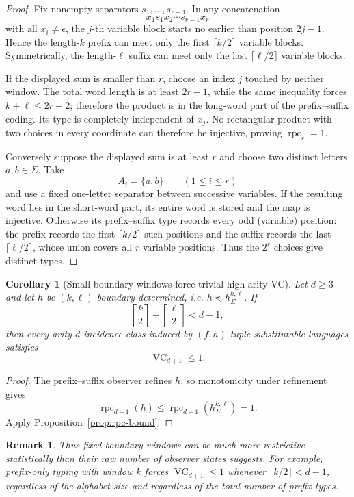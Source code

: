 \documentclass[11pt]{article}
\newtheorem{corollary}[theorem]{Corollary}
\newtheorem{remark}[theorem]{Remark}
\newcommand{\VC}{\operatorname{VC}}
\begin{document}
\begin{proof}
Fix nonempty separators \(s_1,\ldots,s_{r-1}\).  In any concatenation
\[
 x_1s_1x_2\cdots s_{r-1}x_r
\]
with all \(x_i\ne\epsilon\), the \(j\)-th variable block starts no earlier
than position \(2j-1\).  Hence the length-\(k\) prefix can meet only the
first \(\lceil k/2\rceil\) variable blocks.  Symmetrically, the
length-\(\ell\) suffix can meet only the last
\(\lceil\ell/2\rceil\) variable blocks.

If the displayed sum is smaller than \(r\), choose an index \(j\) touched by
neither window.  The total word length is at least \(2r-1\), while the same
inequality forces \(k+\ell\le2r-2\); therefore the product is in the
long-word part of the prefix--suffix coding.  Its type is completely
independent of \(x_j\).  No rectangular product with two choices in every
coordinate can therefore be injective, proving
\(\operatorname{rpc}_r=1\).

Conversely suppose the displayed sum is at least \(r\) and choose two
distinct letters \(a,b\in\Sigma\).  Take
\[
 A_i=\{a,b\}\qquad(1\le i\le r)
\]
and use a fixed one-letter separator between successive variables.  If the
resulting word lies in the short-word part, its entire word is stored and the
map is injective.  Otherwise its prefix--suffix type records every odd
(variable) position: the prefix records the first
\(\lceil k/2\rceil\) such positions and the suffix records the last
\(\lceil\ell/2\rceil\), whose union covers all \(r\) variable positions.
Thus the \(2^r\) choices give distinct types.
\end{proof}

\begin{corollary}[Small boundary windows force trivial high-arity VC]
\label{cor:boundary-vc-one}
Let \(d\ge3\) and let \(h\) be \((k,\ell)\)-boundary-determined, i.e.
\(h\preceq h_\Sigma^{k,\ell}\). If
\[
 \left\lceil\frac{k}{2}\right\rceil+
 \left\lceil\frac{\ell}{2}\right\rceil<d-1,
\]
then every arity-\(d\) incidence class induced by
\((f,h)\)-tuple-substitutable languages satisfies
\[
 \VC_{d+1}\le1.
\]
\end{corollary}

\begin{proof}
The prefix--suffix observer refines \(h\), so monotonicity under refinement
gives
\[
 \operatorname{rpc}_{d-1}(h)
 \le \operatorname{rpc}_{d-1}(h_\Sigma^{k,\ell})=1.
\]
Apply Proposition~\ref{prop:rpc-bound}.
\end{proof}

\begin{remark}
Thus fixed boundary windows can be much more restrictive statistically than
their raw number of observer states suggests.  For example, prefix-only
typing with window \(k\) forces \(\VC_{d+1}\le1\) whenever
\(\lceil k/2\rceil<d-1\), regardless of the alphabet size and regardless of
the total number of prefix types.
\end{remark}
\end{document}

